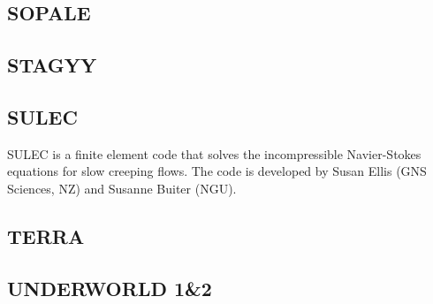 \documentclass[a4paper]{article}
\begin{document}
\subsection{SOPALE}

\subsection{STAGYY}

\subsection{SULEC}
SULEC is a finite element code that solves the incompressible Navier-Stokes equations 
for slow creeping flows. The code is developed by Susan Ellis 
(GNS Sciences, NZ) and Susanne Buiter (NGU). 


\subsection{TERRA}

\subsection{UNDERWORLD 1\&2}




\newpage
%

\newpage
%

%

\newpage
%
\end{document}

